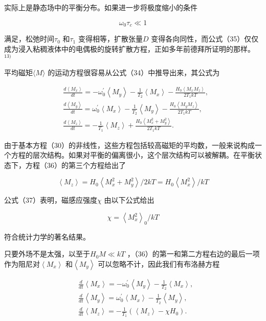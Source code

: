 \documentclass[10pt]{article}
\begin{document}
实际上是静态场中的平衡分布。如果进一步将极度缩小的条件

\[
\omega_{0} \tau_{c} \ll 1
\] 

满足，松弛时间\(\tau_{0}\) 和\(\tau_{1}\) 变得相等，扩散张量\(D\) 变得各向同性，而公式（35）仅仅成为浸入粘稠液体中的电偶极的旋转扩散方程，正如多年前德拜所证明的那样。\({ }^{13)}\) 

平均磁矩\(\langle M\rangle\) 的运动方程很容易从公式（34）中推导出来，其公式为

\[
\begin{aligned}
& \frac{d\left\langle M_{x}\right\rangle}{d t}=-\omega_{0}^{\prime}\left\langle M_{y}\right\rangle-\frac{1}{T_{2}}\left\langle M_{x}\right\rangle-\frac{H_{0}\left\langle M_{x} M_{z}\right\rangle}{2 T_{1} k T}, \\
& \frac{d\left\langle M_{y}\right\rangle}{d t}=\omega_{0}^{\prime}\left\langle M_{x}\right\rangle-\frac{1}{T_{2}}\left\langle M_{y}\right\rangle-\frac{H_{0}\left\langle M_{y} M_{z}\right\rangle}{2 T_{1} k T}, \\
& \frac{d\left\langle M_{z}\right\rangle}{d t}=-\frac{1}{T_{1}}\left\langle M_{z}\right\rangle+\frac{H_{0}\left\langle M_{x}^{2}+M_{y}^{2}\right\rangle}{2 T_{1} k T} .
\end{aligned}
\] 

由于基本方程（30）的非线性，这些方程包括较高磁矩的平均数，一般来说构成一个方程的层次结构。如果对平衡的偏离很小，这个层次结构可以被解耦。在平衡状态下，方程（36）的第三个方程给出了

\[
\left\langle M_{z}\right\rangle=H_{0}\left\langle M_{x}^{2}+M_{y}^{2}\right\rangle / 2 k T=H_{0}\left\langle M_{x}^{2}\right\rangle / k T
\] 

公式（37）表明，磁感应强度\(\chi\) 由以下公式给出

\[
\chi=\left\langle M_{x}^{2}\right\rangle_{0} / k T
\] 

符合统计力学的著名结果。

只要外场不是太强，以至于\(H_{0} M \ll k T\) ，（36）的第一和第二方程右边的最后一项作为阻尼对\(\left\langle M_{x}\right\rangle\) 和\(\left\langle M_{y}\right\rangle\) 可以忽略不计，因此我们有布洛赫方程

\[
\begin{aligned}
& \frac{d}{d t}\left\langle M_{x}\right\rangle=-\omega_{0}^{\prime}\left\langle M_{y}\right\rangle-\frac{1}{T_{2}}\left\langle M_{x}\right\rangle, \\
& \frac{d}{d t}\left\langle M_{y}\right\rangle=\omega_{0}^{\prime}\left\langle M_{x}\right\rangle-\frac{1}{T_{2}}\left\langle M_{y}\right\rangle, \\
& \frac{d}{d t}\left\langle M_{z}\right\rangle=-\frac{1}{T_{1}}\left(\left\langle M_{z}\right\rangle-\chi H_{0}\right) .
\end{aligned}
\] 
\end{document}

